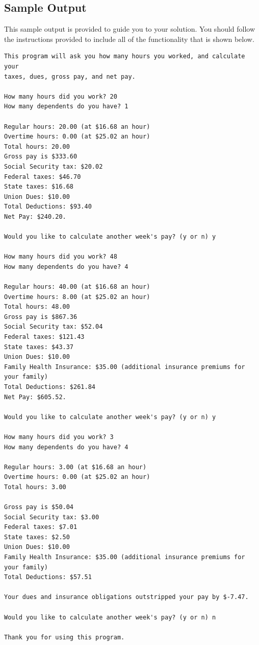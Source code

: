 \subsection*{Sample Output}
This sample output is provided to guide you to your solution. You should follow the instructions provided to include all of the functionality that is shown below.
\begin{lstlisting}[style=none]
This program will ask you how many hours you worked, and calculate your
taxes, dues, gross pay, and net pay.

How many hours did you work? 20
How many dependents do you have? 1

Regular hours: 20.00 (at $16.68 an hour)
Overtime hours: 0.00 (at $25.02 an hour)
Total hours: 20.00
Gross pay is $333.60
Social Security tax: $20.02
Federal taxes: $46.70
State taxes: $16.68
Union Dues: $10.00
Total Deductions: $93.40
Net Pay: $240.20.

Would you like to calculate another week's pay? (y or n) y

How many hours did you work? 48
How many dependents do you have? 4

Regular hours: 40.00 (at $16.68 an hour)
Overtime hours: 8.00 (at $25.02 an hour)
Total hours: 48.00
Gross pay is $867.36
Social Security tax: $52.04
Federal taxes: $121.43
State taxes: $43.37
Union Dues: $10.00
Family Health Insurance: $35.00 (additional insurance premiums for your family)
Total Deductions: $261.84
Net Pay: $605.52.

Would you like to calculate another week's pay? (y or n) y

How many hours did you work? 3
How many dependents do you have? 4

Regular hours: 3.00 (at $16.68 an hour)
Overtime hours: 0.00 (at $25.02 an hour)
Total hours: 3.00

Gross pay is $50.04
Social Security tax: $3.00
Federal taxes: $7.01
State taxes: $2.50
Union Dues: $10.00
Family Health Insurance: $35.00 (additional insurance premiums for your family)
Total Deductions: $57.51

Your dues and insurance obligations outstripped your pay by $-7.47.

Would you like to calculate another week's pay? (y or n) n

Thank you for using this program.
\end{lstlisting}

